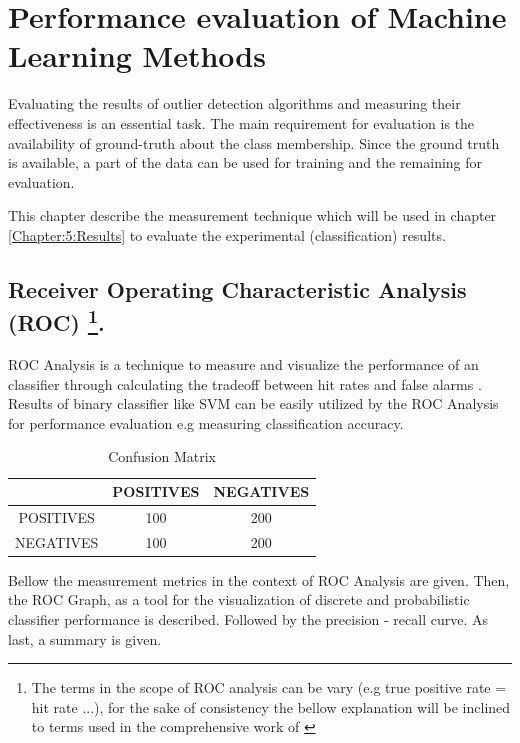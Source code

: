\chapter{Performance evaluation of Machine Learning Methods}\label{Chapter:4}


Evaluating the results of outlier detection algorithms and measuring their effectiveness is an essential task. The main requirement for evaluation is the availability of ground-truth about the class membership. Since the ground truth is available, a part of the data can be used for training and the remaining for evaluation. 

This chapter describe the measurement technique which will be used in chapter \ref{Chapter:5:Results} to evaluate the experimental (classification) results. 

\section[Receiver Operating Characteristic Analysis (ROC)] {Receiver Operating Characteristic Analysis (ROC) \footnote{The terms in the scope of ROC analysis can be vary (e.g true positive rate = hit rate ...), for the sake of consistency the bellow explanation will be inclined to terms used in the comprehensive work of \cite{Fawcett:2006:IRA:1159473.1159475}}.}\label{Chapter:4:ROC}

ROC Analysis is a technique to measure and visualize the performance of an classifier through calculating the tradeoff between hit rates and false alarms \cite{Fawcett:2006:IRA:1159473.1159475}. Results of binary classifier like SVM can be easily utilized by the ROC Analysis for performance evaluation e.g measuring classification accuracy.


\begin{table}[ht!]
    \begin{center}
    \caption{Confusion Matrix}
    \label{tab:conf-matrix}
        \begin{tabular}{|c|c|c|}
        \hline
        &POSITIVES&NEGATIVES\\
        \hline
        POSITIVES&100 & 200 \\
        \hline
        NEGATIVES&100 & 200 \\
        \hline
        \end{tabular}
\end{center}
\end{table}


Bellow the measurement metrics in the context of ROC Analysis are given. Then, the ROC Graph, as a tool for the visualization of discrete and probabilistic classifier performance is described. Followed by the precision - recall curve. As last, a summary is given.

